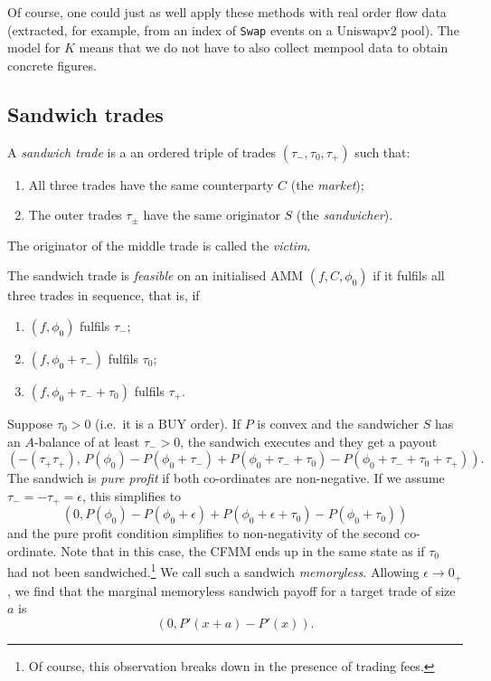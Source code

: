 \documentclass[a4paper,11pt]{article}
\begin{document}
Of course, one could just as well apply these methods with real order flow data (extracted, for example, from an index of \texttt{Swap} events on a Uniswapv2 pool).
%
The model for $K$ means that we do not have to also collect mempool data to obtain concrete figures.

\subsection{Sandwich trades}
\label{sandwich}



\begin{definition}[Sandwich]

  A \emph{sandwich trade} is a an ordered triple of trades $(\tau_-,\tau_0,\tau_+)$ such that:
  \begin{enumerate}
    \item All three trades have the same counterparty $C$ (the \emph{market});
    \item The outer trades $\tau_\pm$ have the same originator $S$ (the \emph{sandwicher}).
  \end{enumerate}
  The originator of the middle trade is called the \emph{victim}.
  
  The sandwich trade is \emph{feasible} on an initialised AMM $(f,C,\phi_0)$ if it fulfils all three trades in sequence, that is, if
  \begin{enumerate}
    \item $(f,\phi_0)$ fulfils $\tau_-$;
    \item $(f,\phi_0 + \tau_-)$ fulfils $\tau_0$;
    \item $(f,\phi_0 + \tau_- + \tau_0)$ fulfils $\tau_+$.
  \end{enumerate}
\end{definition}


Suppose $\tau_0>0$ (i.e.~it is a BUY order).
%
If $P$ is convex and the sandwicher $S$ has an $A$-balance of at least $\tau_->0$, the sandwich executes and they get a payout 
\[
  (-(\tau_+\tau_+) ,\, P(\phi_0)-P(\phi_0+\tau_-) + P(\phi_0+ \tau_- + \tau_0) - P(\phi_0+ \tau_- + \tau_0 + \tau_+)).
\]
The sandwich is \emph{pure profit} if both co-ordinates are non-negative.
%
If we assume $\tau_-=-\tau_+=\epsilon$, this simplifies to
\begin{equation}
\label{sandwich-payoff}
  (0, P(\phi_0)-P(\phi_0+\epsilon) + P(\phi_0+ \epsilon + \tau_0) - P(\phi_0+ \tau_0 ))
\end{equation}
and the pure profit condition simplifies to non-negativity of the second co-ordinate.
%
Note that in this case, the CFMM ends up in the same state as if $\tau_0$ had not been sandwiched.\footnote{Of course, this observation breaks down in the presence of trading fees.}
%
We call such a sandwich \emph{memoryless}.
%
Allowing $\epsilon\rightarrow 0_+$, we find that the marginal memoryless sandwich payoff for a target trade of size $a$ is 
\begin{equation}
\label{sandwich-marginal}
  (0,P'(x+a) - P'(x)).
\end{equation}
\end{document}
